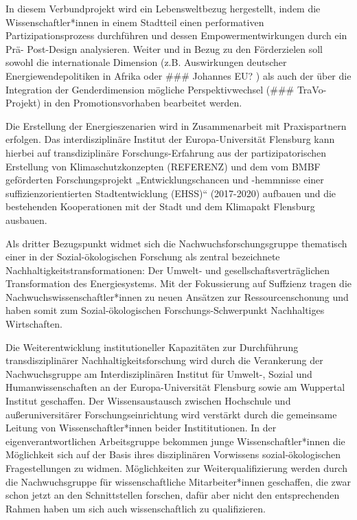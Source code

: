 \documentclass[a4paper,11pt,twoside]{scrartcl}
\begin{document}
In diesem Verbundprojekt wird ein Lebensweltbezug hergestellt, indem die Wissenschaftler*innen in einem Stadtteil einen performativen Partizipationsprozess durchführen und dessen Empowermentwirkungen durch ein Prä- Post-Design analysieren. 
Weiter und in Bezug zu den Förderzielen soll sowohl die internationale Dimension (z.B. Auswirkungen deutscher Energiewendepolitiken in Afrika oder ### Johannes EU? ) als auch der über die Integration der Genderdimension mögliche Perspektivwechsel (### TraVo-Projekt) in den Promotionsvorhaben bearbeitet werden.

Die Erstellung der Energieszenarien wird in Zusammenarbeit mit Praxispartnern erfolgen. Das interdisziplinäre Institut der Europa-Universität Flensburg kann hierbei auf transdiziplinäre Forschungs-Erfahrung aus der partizipatorischen Erstellung von Klimaschutzkonzepten (REFERENZ) und dem vom BMBF geförderten Forschungsprojekt „Entwicklungschancen und -hemmnisse einer suffizienzorientierten Stadtentwicklung (EHSS)“ (2017-2020) aufbauen und die bestehenden Kooperationen mit der Stadt und dem Klimapakt Flensburg ausbauen.

Als dritter Bezugspunkt widmet sich die Nachwuchsforschungsgruppe thematisch einer in der Sozial-ökologischen Forschung als zentral bezeichnete Nachhaltigkeitstransformationen: Der Umwelt- und gesellschaftsverträglichen Transformation des Energiesystems. Mit der Fokussierung auf Suffzienz tragen die Nachwuchswissenschaftler*innen zu neuen Ansätzen zur Ressourcenschonung und haben somit zum Sozial-ökologischen Forschungs-Schwerpunkt Nachhaltiges Wirtschaften.

Die Weiterentwicklung institutioneller Kapazitäten zur Durchführung transdisziplinärer Nachhaltigkeitsforschung wird durch die Verankerung der Nachwuchsgruppe am Interdisziplinären Institut für Umwelt-, Sozial und Humanwissenschaften an der Europa-Universität Flensburg sowie am Wuppertal Institut geschaffen. Der Wissensaustausch zwischen Hochschule und außeruniversitärer Forschungseinrichtung wird verstärkt durch die gemeinsame Leitung von Wissenschaftler*innen beider Instititutionen. In der eigenverantwortlichen Arbeitsgruppe bekommen junge Wissenschaftler*innen die Möglichkeit sich auf der Basis ihres disziplinären Vorwissens sozial-ökologischen Fragestellungen zu widmen. Möglichkeiten zur Weiterqualifizierung werden durch die Nachwuchsgruppe für wissenschaftliche Mitarbeiter*innen geschaffen, die zwar schon jetzt an den Schnittstellen forschen, dafür aber nicht den entsprechenden Rahmen haben um sich auch wissenschaftlich zu qualifizieren.
\end{document}
